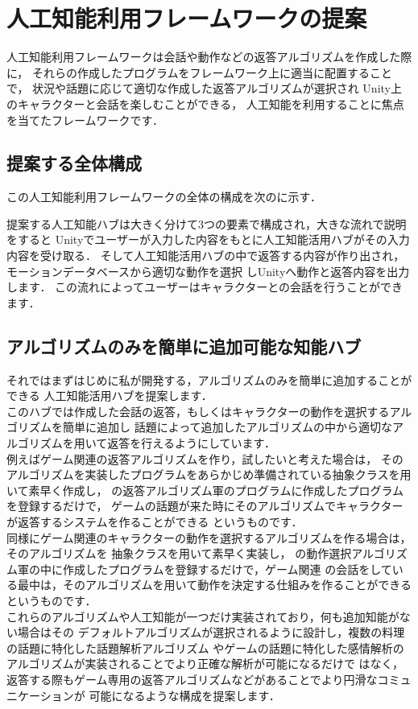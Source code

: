 \section{人工知能利用フレームワークの提案}
人工知能利用フレームワークは会話や動作などの返答アルゴリズムを作成した際に，
それらの作成したプログラムをフレームワーク上に適当に配置することで，
状況や話題に応じて適切な作成した返答アルゴリズムが選択され
Unity上のキャラクターと会話を楽しむことができる，
人工知能を利用することに焦点を当てたフレームワークです．
\subsection{提案する全体構成}\label{sec:allAr}
この人工知能利用フレームワークの全体の構成を次のに示す．


提案する人工知能ハブは大きく分けて3つの要素で構成され，大きな流れで説明をすると
Unityでユーザーが入力した内容をもとに人工知能活用ハブがその入力内容を受け取る．
そして人工知能活用ハブの中で返答する内容が作り出され，モーションデータベースから適切な動作を選択
しUnityへ動作と返答内容を出力します．
この流れによってユーザーはキャラクターとの会話を行うことができます．
\subsection{アルゴリズムのみを簡単に追加可能な知能ハブ}
それではまずはじめに私が開発する，アルゴリズムのみを簡単に追加することができる
人工知能活用ハブを提案します．
\\
このハブでは作成した会話の返答，もしくはキャラクターの動作を選択するアルゴリズムを簡単に追加し
話題によって追加したアルゴリズムの中から適切なアルゴリズムを用いて返答を行えるようにしています．
\\
例えばゲーム関連の返答アルゴリズムを作り，試したいと考えた場合は，
そのアルゴリズムを実装したプログラムをあらかじめ準備されている抽象クラスを用いて素早く作成し，
の返答アルゴリズム軍のプログラムに作成したプログラムを登録するだけで，
ゲームの話題が来た時にそのアルゴリズムでキャラクターが返答するシステムを作ることができる
というものです．
\\
同様にゲーム関連のキャラクターの動作を選択するアルゴリズムを作る場合は，そのアルゴリズムを
抽象クラスを用いて素早く実装し，
の動作選択アルゴリズム軍の中に作成したプログラムを登録するだけで，ゲーム関連
の会話をしている最中は，そのアルゴリズムを用いて動作を決定する仕組みを作ることができるというものです．
\\
これらのアルゴリズムや人工知能が一つだけ実装されており，何も追加知能がない場合はその
デフォルトアルゴリズムが選択されるように設計し，複数の料理の話題に特化した話題解析アルゴリズム
やゲームの話題に特化した感情解析のアルゴリズムが実装されることでより正確な解析が可能になるだけで
はなく，返答する際もゲーム専用の返答アルゴリズムなどがあることでより円滑なコミュニケーションが
可能になるような構成を提案します．

